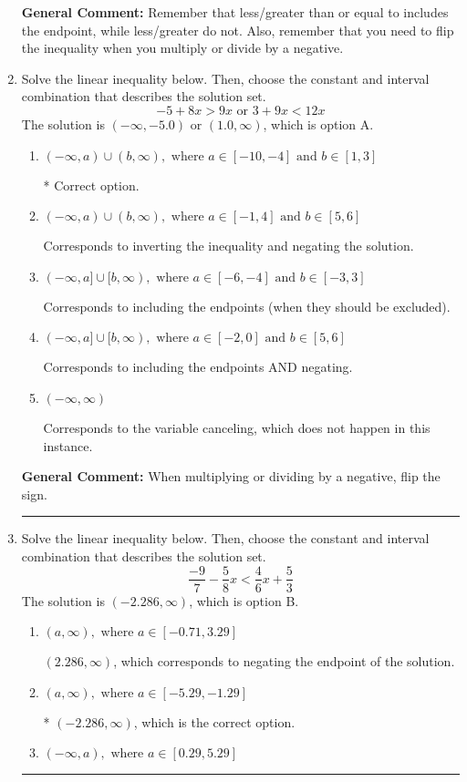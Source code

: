 \documentclass{extbook}[14pt]
\newcommand{\litem}[1]{\item #1

\rule{\textwidth}{0.4pt}}
\begin{document}
\begin{enumerate}
{\textbf{General Comment:} Remember that less/greater than or equal to includes the endpoint, while less/greater do not. Also, remember that you need to flip the inequality when you multiply or divide by a negative.
}
\litem{
Solve the linear inequality below. Then, choose the constant and interval combination that describes the solution set.
\[ -5 + 8 x > 9 x \text{ or } 3 + 9 x < 12 x \]
The solution is \( (-\infty, -5.0) \text{ or } (1.0, \infty) \), which is option A.\begin{enumerate}[label=\Alph*.]
\item \( (-\infty, a) \cup (b, \infty), \text{ where } a \in [-10, -4] \text{ and } b \in [1, 3] \)

 * Correct option.
\item \( (-\infty, a) \cup (b, \infty), \text{ where } a \in [-1, 4] \text{ and } b \in [5, 6] \)

Corresponds to inverting the inequality and negating the solution.
\item \( (-\infty, a] \cup [b, \infty), \text{ where } a \in [-6, -4] \text{ and } b \in [-3, 3] \)

Corresponds to including the endpoints (when they should be excluded).
\item \( (-\infty, a] \cup [b, \infty), \text{ where } a \in [-2, 0] \text{ and } b \in [5, 6] \)

Corresponds to including the endpoints AND negating.
\item \( (-\infty, \infty) \)

Corresponds to the variable canceling, which does not happen in this instance.
\end{enumerate}

\textbf{General Comment:} When multiplying or dividing by a negative, flip the sign.
}
\litem{
Solve the linear inequality below. Then, choose the constant and interval combination that describes the solution set.
\[ \frac{-9}{7} - \frac{5}{8} x < \frac{4}{6} x + \frac{5}{3} \]
The solution is \( (-2.286, \infty) \), which is option B.\begin{enumerate}[label=\Alph*.]
\item \( (a, \infty), \text{ where } a \in [-0.71, 3.29] \)

 $(2.286, \infty)$, which corresponds to negating the endpoint of the solution.
\item \( (a, \infty), \text{ where } a \in [-5.29, -1.29] \)

* $(-2.286, \infty)$, which is the correct option.
\item \( (-\infty, a), \text{ where } a \in [0.29, 5.29] \)


\end{enumerate}}
\end{enumerate}
\end{document}

